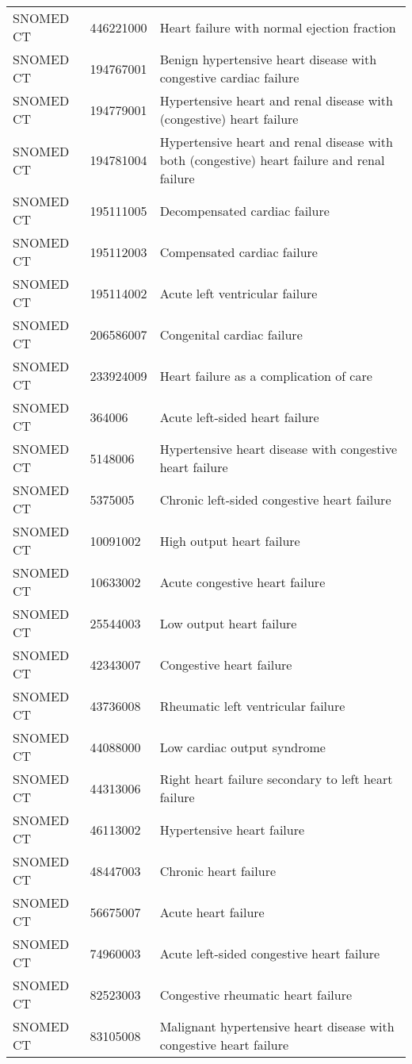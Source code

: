 \begin{longtable}{p{}p{}p{}}
  SNOMED CT & 446221000 & Heart failure with normal ejection fraction \\ 
  SNOMED CT & 194767001 & Benign hypertensive heart disease with congestive cardiac failure \\ 
  SNOMED CT & 194779001 & Hypertensive heart and renal disease with (congestive) heart failure \\ 
  SNOMED CT & 194781004 & Hypertensive heart and renal disease with both (congestive) heart failure and renal failure \\ 
  SNOMED CT & 195111005 & Decompensated cardiac failure \\ 
  SNOMED CT & 195112003 & Compensated cardiac failure \\ 
  SNOMED CT & 195114002 & Acute left ventricular failure \\ 
  SNOMED CT & 206586007 & Congenital cardiac failure \\ 
  SNOMED CT & 233924009 & Heart failure as a complication of care \\ 
  SNOMED CT & 364006 & Acute left-sided heart failure \\ 
  SNOMED CT & 5148006 & Hypertensive heart disease with congestive heart failure \\ 
  SNOMED CT & 5375005 & Chronic left-sided congestive heart failure \\ 
  SNOMED CT & 10091002 & High output heart failure \\ 
  SNOMED CT & 10633002 & Acute congestive heart failure \\ 
  SNOMED CT & 25544003 & Low output heart failure \\ 
  SNOMED CT & 42343007 & Congestive heart failure \\ 
  SNOMED CT & 43736008 & Rheumatic left ventricular failure \\ 
  SNOMED CT & 44088000 & Low cardiac output syndrome \\ 
  SNOMED CT & 44313006 & Right heart failure secondary to left heart failure \\ 
  SNOMED CT & 46113002 & Hypertensive heart failure \\ 
  SNOMED CT & 48447003 & Chronic heart failure \\ 
  SNOMED CT & 56675007 & Acute heart failure \\ 
  SNOMED CT & 74960003 & Acute left-sided congestive heart failure \\ 
  SNOMED CT & 82523003 & Congestive rheumatic heart failure \\ 
  SNOMED CT & 83105008 & Malignant hypertensive heart disease with congestive heart failure \\ 

\end{longtable}
